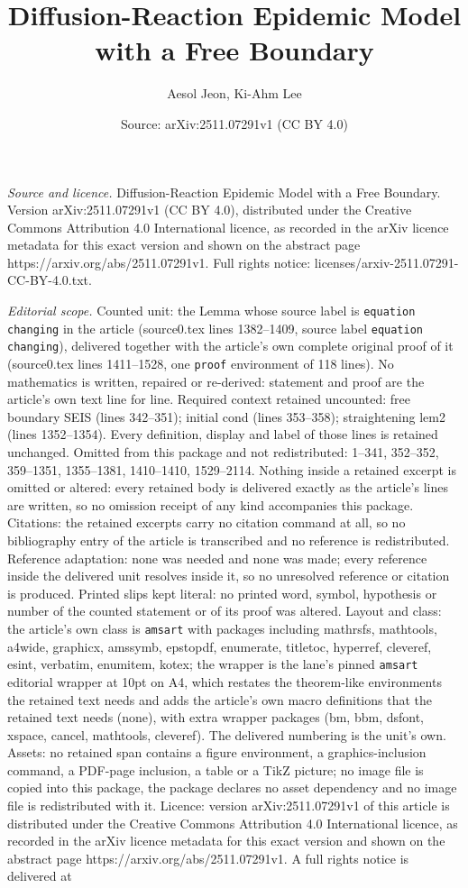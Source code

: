\documentclass[10pt,a4paper]{amsart}
\title[Diffusion-Reaction Epidemic Model with a Free Boundary]{Diffusion-Reaction Epidemic Model with a Free Boundary}
\author{Aesol Jeon, Ki-Ahm Lee}
\date{Source: arXiv:2511.07291v1 (CC BY 4.0)}
\begin{document}
\maketitle

\noindent\emph{Source and licence.} Diffusion-Reaction Epidemic Model with a Free Boundary. Version arXiv:2511.07291v1 (CC BY 4.0), distributed under the Creative Commons Attribution 4.0 International licence, as recorded in the arXiv licence metadata for this exact version and shown on the abstract page https://arxiv.org/abs/2511.07291v1. Full rights notice: licenses/arxiv-2511.07291-CC-BY-4.0.txt.\par\smallskip

\noindent\textit{Editorial scope.} Counted unit: the Lemma whose source label is \texttt{equation changing} in the article (source0.tex lines 1382--1409, source label \texttt{equation changing}), delivered together with the article's own complete original proof of it (source0.tex lines 1411--1528, one \texttt{proof} environment of 118 lines). No mathematics is written, repaired or re-derived: statement and proof are the article's own text line for line. Required context retained uncounted: free boundary SEIS (lines 342--351); initial cond (lines 353--358); straightening lem2 (lines 1352--1354). Every definition, display and label of those lines is retained unchanged. Omitted from this package and not redistributed: 1--341, 352--352, 359--1351, 1355--1381, 1410--1410, 1529--2114. Nothing inside a retained excerpt is omitted or altered: every retained body is delivered exactly as the article's lines are written, so no omission receipt of any kind accompanies this package. Citations: the retained excerpts carry no citation command at all, so no bibliography entry of the article is transcribed and no reference is redistributed. Reference adaptation: none was needed and none was made; every reference inside the delivered unit resolves inside it, so no unresolved reference or citation is produced. Printed slips kept literal: no printed word, symbol, hypothesis or number of the counted statement or of its proof was altered. Layout and class: the article's own class is \texttt{amsart} with packages including mathrsfs, mathtools, a4wide, graphicx, amssymb, epstopdf, enumerate, titletoc, hyperref, cleveref, esint, verbatim, enumitem, kotex; the wrapper is the lane's pinned \texttt{amsart} editorial wrapper at 10pt on A4, which restates the theorem-like environments the retained text needs and adds the article's own macro definitions that the retained text needs (none), with extra wrapper packages (bm, bbm, dsfont, xspace, cancel, mathtools, cleveref). The delivered numbering is the unit's own. Assets: no retained span contains a figure environment, a graphics-inclusion command, a PDF-page inclusion, a table or a TikZ picture; no image file is copied into this package, the package declares no asset dependency and no image file is redistributed with it. Licence: version arXiv:2511.07291v1 of this article is distributed under the Creative Commons Attribution 4.0 International licence, as recorded in the arXiv licence metadata for this exact version and shown on the abstract page https://arxiv.org/abs/2511.07291v1. A full rights notice is delivered at 
\end{document}

